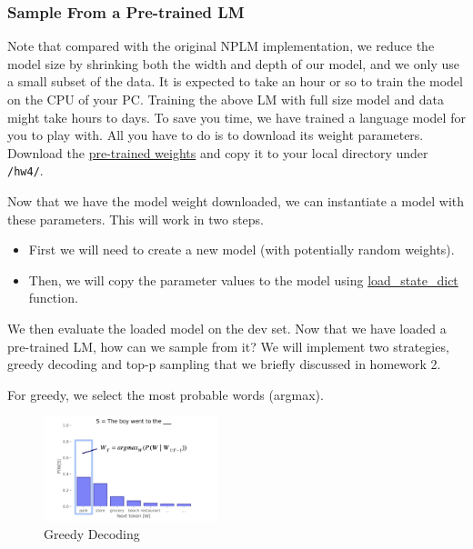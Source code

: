 \subsubsection{Sample From a Pre-trained LM}
Note that compared with the original NPLM implementation, we reduce the model size by shrinking both the width and depth of our model, and we only use a small subset of the data. It is expected to take an hour or so to train the model on the CPU of your PC. Training the above LM with full size model and data might take hours to days. To save you time, we have trained a language model for you to play with. All you have to do is to download its weight parameters. Download the 
\href{https://livejohnshopkins-my.sharepoint.com/:u:/g/personal/dkhasha1_jh_edu/EW5N2dBb3ftAnQuannVNU_QBmmEn-VStlnVGWp5mRHdT-Q?e=NIChGd}{pre-trained weights} and copy it to your local directory under \texttt{/hw4/}.

Now that we have the model weight downloaded, we can instantiate a model with these parameters. This will work in two steps.
\begin{itemize}
    \item First we will need to create a new model (with potentially random weights).
    \item Then, we will copy the parameter values to the model using \href{https://pytorch.org/tutorials/beginner/saving_loading_models.html}{load\_state\_dict} function.
\end{itemize}
We then evaluate the loaded model on the dev set.
Now that we have loaded a pre-trained LM, how can we sample from it? We will implement two strategies, greedy decoding and top-p sampling \citep{holtzman2019curious} that we briefly discussed in homework 2.

For greedy, we select the most probable words (argmax).
\begin{figure}[h]
    \centering
    \includegraphics[width=0.45\textwidth]{figures/argmax_sampling.jpeg}
    \caption{Greedy Decoding}
\end{figure}

